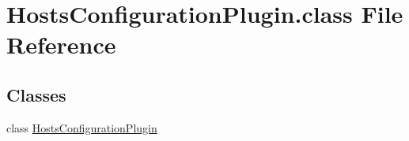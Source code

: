 \hypertarget{HostsConfigurationPlugin_8class}{\section{Hosts\-Configuration\-Plugin.\-class File Reference}
\label{HostsConfigurationPlugin_8class}
}
\subsection*{Classes}
\begin{DoxyCompactItemize}
\item 
class \hyperlink{classHostsConfigurationPlugin}{Hosts\-Configuration\-Plugin}
\end{DoxyCompactItemize}
